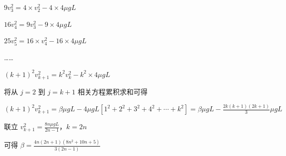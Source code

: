 \documentclass[\gkver]{gaokaozhenti}
\begin{document}
\begin{enumerate}
{\begin{enumerate}
	$9v_{3}^{2} = 4 \times v_{2}^{2} - 4 \times 4\mu gL$

	$16v_{4}^{2} = 9v_{3}^{2} - 9 \times 4\mu gL$

	$25v_{5}^{2} = 16 \times v_{4}^{2} - 16 \times 4\mu gL$

	……

	$(k+1)^{2} v_{k+1}^{2} = k^{2} v_{k}^{2} - k^{2} \times 4\mu gL$

	将从 $j = 2$ 到 $j = k+1$ 相关方程累积求和可得

	$(k+1)^{2} v_{k+1}^{2} = \beta\mu gL - 4\mu gL \left[1^{2} + 2^{2} + 3^{2} + 4^{2} + \cdots + k^{2}\right] = \beta\mu gL - \frac{2k(k+1)(2k+1)}{3}\mu gL$

	联立 $v_{k+1}^{2} = \frac{8n\mu gL}{2n-1}$，$k = 2n$

	可得 $\beta = \frac{4n(2n+1)(8n^{2} + 10n+5)}{3(2n-1)}$
\end{enumerate}
}

\end{enumerate}
\end{document}

